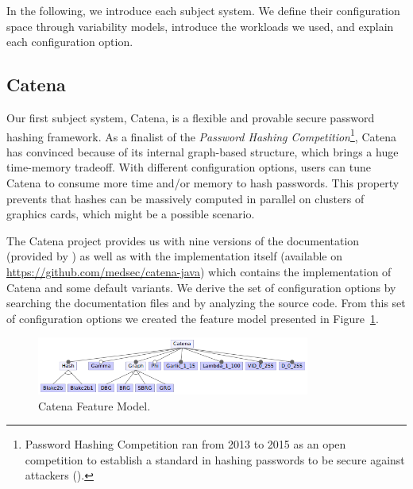 
In the following, we introduce each subject system. We define their configuration space through variability models, introduce the workloads we used, and explain each configuration option. 

\subsection{Catena}

Our first subject system, Catena, is a flexible and provable secure password hashing framework. As a finalist of the \textit{Password Hashing Competition}\footnote{Password Hashing Competition ran from 2013 to 2015 as an open competition to establish a standard in hashing passwords to be secure against attackers (\cite{phc2015}).}, Catena has convinced because of its internal graph-based structure, which brings a huge time-memory tradeoff. With different configuration options, users can tune Catena to consume more time and/or memory to hash passwords. This property prevents that hashes can be massively computed in parallel on clusters of graphics cards, which might be a possible scenario. 

The Catena project provides us with nine versions of the documentation (provided by \cite{catena2014medsec}) as well as with the implementation itself (available on \url{https://github.com/medsec/catena-java}) which contains the implementation of Catena and some default variants. We derive the set of configuration options by searching the documentation files and by analyzing the source code. From this set of configuration options we created the feature model presented in Figure~\ref{fm_catena}.

\begin{figure}
  \centering
  \includegraphics[width=0.8\textwidth]{images/Catena_Feature_model}
  \caption{Catena Feature Model.}
  \label{fm_catena}
\end{figure}

